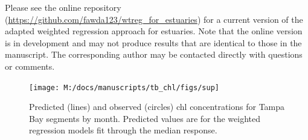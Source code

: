 \documentclass{svjour3}\usepackage[]{graphicx}\usepackage[]{color}
\newcommand{\beginsupplement}{%
        \setcounter{table}{0}
        \renewcommand{\thetable}{S\arabic{table}}%
        \setcounter{figure}{0}
        \renewcommand{\thefigure}{S\arabic{figure}}%
     }
\begin{document}
Please see the online repository (\href{https://github.com/fawda123/wtreg\_for\_estuaries}{https://github.com/fawda123/wtreg\_for\_estuaries}) for a current version of the adapted weighted regression approach for estuaries.  Note that the online version is in development and may not produce results that are identical to those in the manuscript. The corresponding author may be contacted directly with questions or comments.  

\beginsupplement
\begin{landscape}
\centering\vspace*{\fill}
\begin{figure}[!ht]


{\centering \texttt{[image: M:/docs/manuscripts/tb\_chl/figs/sup]} 

}

\caption[Predicted (lines) and observed (circles) \ac{chl} concentrations for Tampa Bay segments by month]{Predicted (lines) and observed (circles) \ac{chl} concentrations for Tampa Bay segments by month.  Predicted values are for the weighted regression models fit through the median response.\label{fig:sup}}
\end{figure}


\vfill
\end{landscape}
\end{document}
